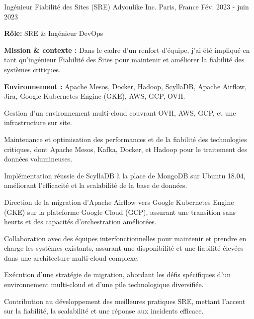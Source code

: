 \begin{cventries}
\cventry
{Ingénieur Fiabilité des Sites (SRE)} %
{Adyoulike Inc.} %
{Paris, France} %
{Fév. 2023 - juin 2023} %
{
  \begin{cvitems} %
    \item {\textbf{Rôle:} SRE \& Ingénieur DevOps}
    \item {\textbf{Mission \& contexte :} Dans le cadre d'un renfort d'équipe, j'ai été impliqué en tant qu'ingénieur Fiabilité des Sites pour maintenir et améliorer la fiabilité des systèmes critiques.}
    \item {\textbf{Environnement :} Apache Mesos, Docker, Hadoop, ScyllaDB, Apache Airflow, Jira, Google Kubernetes Engine (GKE), AWS, GCP, OVH.}
    \item {Gestion d'un environnement multi-cloud couvrant OVH, AWS, GCP, et une infrastructure sur site.}
    \item {Maintenance et optimisation des performances et de la fiabilité des technologies critiques, dont Apache Mesos, Kafka, Docker, et Hadoop pour le traitement des données volumineuses.}
    \item {Implémentation réussie de ScyllaDB à la place de MongoDB sur Ubuntu 18.04, améliorant l'efficacité et la scalabilité de la base de données.}
    \item {Direction de la migration d'Apache Airflow vers Google Kubernetes Engine (GKE) sur la plateforme Google Cloud (GCP), assurant une transition sans heurts et des capacités d'orchestration améliorées.}
    \item {Collaboration avec des équipes interfonctionnelles pour maintenir et prendre en charge les systèmes existants, assurant une disponibilité et une fiabilité élevées dans une architecture multi-cloud complexe.}
    \item {Exécution d'une stratégie de migration, abordant les défis spécifiques d'un environnement multi-cloud et d'une pile technologique diversifiée.}
    \item {Contribution au développement des meilleures pratiques SRE, mettant l'accent sur la fiabilité, la scalabilité et une réponse aux incidents efficace.}
  \end{cvitems}
}


\end{cventries}
